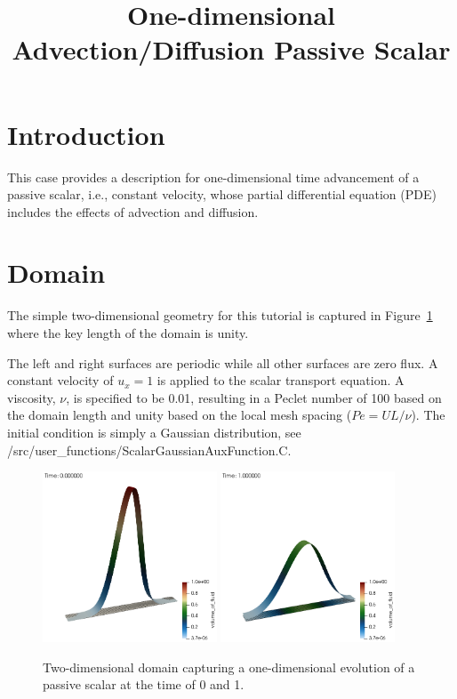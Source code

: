 \documentclass{article}
\title{One-dimensional Advection/Diffusion Passive Scalar}
\date{}
\begin{document}
\maketitle

\section{Introduction}
This case provides a description for one-dimensional time advancement
of a passive scalar, i.e., constant velocity, whose partial differential
equation (PDE) includes the effects of advection and diffusion.

\section{Domain}
The simple two-dimensional geometry for this tutorial is captured in 
Figure~\ref{fig:geom} where the key length of the domain is unity.

The left and right surfaces are periodic while all other surfaces are zero flux. 
A constant velocity of $u_x = 1$ is applied to the scalar transport equation. A
viscosity, $\nu$, is specified to be 0.01, resulting in a Peclet number of 100 based on the 
domain length and unity based on the local mesh spacing ($Pe = U L/\nu$). The initial condition 
is simply a Gaussian distribution, see /src/user\_functions/ScalarGaussianAuxFunction.C.

\begin{figure}[!htbp]
  \centering
  {
   \includegraphics[height=2.0in]{images/oneD_teq0.png}
  }
  {
   \includegraphics[height=2.0in]{images/oneD_teq1.png}
  }
  \caption{Two-dimensional domain capturing a one-dimensional evolution of a passive scalar at the time of 0 and 1.}
  \label{fig:geom}
\end{figure}
\end{document}
